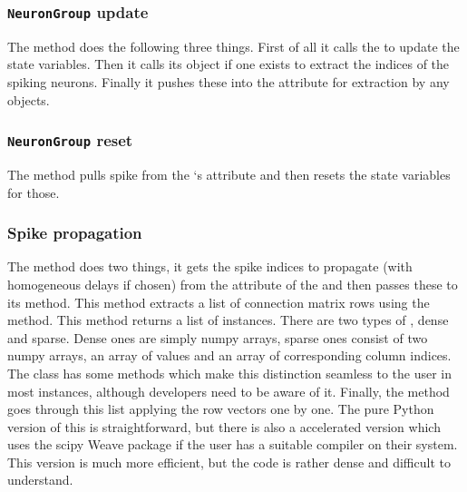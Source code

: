 \documentclass[letterpaper,10pt,english]{manual}
\begin{document}
\subsubsection{\texttt{NeuronGroup} update}

The  method does the following three things. First of
all it calls the  to update the state variables. Then it calls
its  object if one exists to extract the indices of the spiking
neurons. Finally it pushes these into the  attribute for extraction by
any  objects.


\subsubsection{\texttt{NeuronGroup} reset}

The  method pulls spike from the `s
 attribute and then resets the state variables for those.


\subsubsection{Spike propagation}

The  method does two things, it gets the spike
indices to propagate (with homogeneous delays if chosen) from the 
attribute of the  and then passes these to its
 method. This method extracts a list of connection
matrix rows using the  method. This method
returns a list of  instances. There are two types of
, dense and sparse. Dense ones are simply numpy arrays,
sparse ones consist of two numpy arrays, an array of values and an array of
corresponding column indices. The  class has
some methods which make this distinction seamless to the user in most instances,
although developers need to be aware of it. Finally, the
 method goes through this list applying the row
vectors one by one. The pure Python version of this is straightforward, but
there is also a  accelerated version which uses the scipy Weave package
if the user has a suitable compiler on their system. This version is much more
efficient, but the code is rather dense and difficult to understand.

\resetcurrentobjects
\hypertarget{--doc-developer-equations}{}
\end{document}
